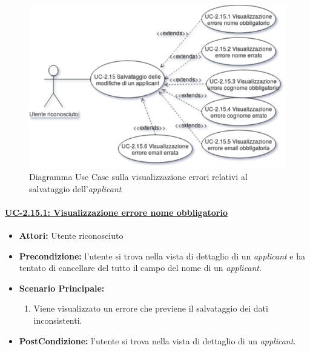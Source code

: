 \begin{figure}[!h] 
	\centering 
	\includegraphics[width=1\columnwidth]{immagini/usecase/UC5} 
	\caption{Diagramma Use Case sulla visualizzazione errori relativi al salvataggio dell'\textit{applicant}}
	\label{figura:uc-5}
\end{figure}


\paragraph{\underline{UC-2.15.1: Visualizzazione errore nome obbligatorio}}
\begin{itemize}	
	\item \textbf{Attori:} Utente riconosciuto
	\item \textbf{Precondizione:}  l'utente si trova nella vista di dettaglio di un \textit{applicant} e ha tentato di cancellare del tutto il campo del nome di un \textit{applicant}.
	\item \textbf{Scenario Principale:}
	\begin{enumerate}
		\item Viene visualizzato un errore che previene il salvataggio dei dati inconsistenti.
	\end{enumerate}
	\item \textbf{PostCondizione:} l'utente si trova nella vista di dettaglio di un \textit{applicant}.
\end{itemize}

